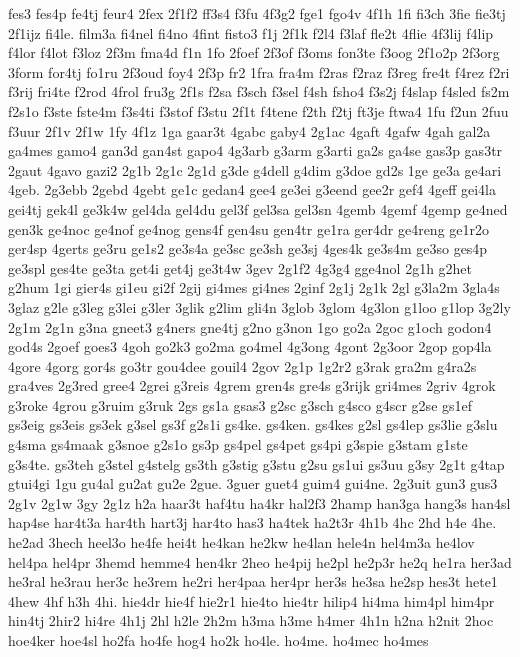 {fes3
fes4p
fe4tj
feur4
2fex
2f1f2
ff3s4
f3fu
4f3g2
fge1
fgo4v
4f1h
1fi
fi3ch
3fie
fie3tj
2f1ijz
fi4le.
film3a
fi4nel
fi4no
4fint
fisto3
f1j
2f1k
f2l4
f3laf
fle2t
4flie
4f3lij
f4lip
f4lor
f4lot
f3loz
2f3m
fma4d
f1n
1fo
2foef
2f3of
f3oms
fon3te
f3oog
2f1o2p
2f3org
3form
for4tj
fo1ru
2f3oud
foy4
2f3p
fr2
1fra
fra4m
f2ras
f2raz
f3reg
fre4t
f4rez
f2ri
f3rij
fri4te
f2rod
4frol
fru3g
2f1s
f2sa
f3sch
f3sel
f4sh
fsho4
f3s2j
f4slap
f4sled
fs2m
f2s1o
f3ste
fste4m
f3s4ti
f3stof
f3stu
2f1t
f4tene
f2th
f2tj
ft3je
ftwa4
1fu
f2un
2fuu
f3uur
2f1v
2f1w
1fy
4f1z
1ga
gaar3t
4gabc
gaby4
2g1ac
4gaft
4gafw
4gah
gal2a
ga4mes
gamo4
gan3d
gan4st
gapo4
4g3arb
g3arm
g3arti
ga2s
ga4se
gas3p
gas3tr
2gaut
4gavo
gazi2
2g1b
2g1c
2g1d
g3de
g4dell
g4dim
g3doe
gd2s
1ge
ge3a
ge4ari
4geb.
2g3ebb
2gebd
4gebt
ge1c
gedan4
gee4
ge3ei
g3eend
gee2r
gef4
4geff
gei4la
gei4tj
gek4l
ge3k4w
gel4da
gel4du
gel3f
gel3sa
gel3sn
4gemb
4gemf
4gemp
ge4ned
gen3k
ge4noc
ge4nof
ge4nog
gens4f
gen4su
gen4tr
ge1ra
ger4dr
ge4reng
ge1r2o
ger4sp
4gerts
ge3ru
ge1s2
ge3s4a
ge3sc
ge3sh
ge3sj
4ges4k
ge3s4m
ge3so
ges4p
ge3spl
ges4te
ge3ta
get4i
get4j
ge3t4w
3gev
2g1f2
4g3g4
gge4nol
2g1h
g2het
g2hum
1gi
gier4s
gi1eu
gi2f
2gij
gi4mes
gi4nes
2ginf
2g1j
2g1k
2gl
g3la2m
3gla4s
3glaz
g2le
g3leg
g3lei
g3ler
3glik
g2lim
gli4n
3glob
3glom
4g3lon
g1loo
g1lop
3g2ly
2g1m
2g1n
g3na
gneet3
g4ners
gne4tj
g2no
g3non
1go
go2a
2goc
g1och
godon4
god4s
2goef
goes3
4goh
go2k3
go2ma
go4mel
4g3ong
4gont
2g3oor
2gop
gop4la
4gore
4gorg
gor4s
go3tr
gou4dee
gouil4
2gov
2g1p
1g2r2
g3rak
gra2m
g4ra2s
gra4ves
2g3red
gree4
2grei
g3reis
4grem
gren4s
gre4s
g3rijk
gri4mes
2griv
4grok
g3roke
4grou
g3ruim
g3ruk
2gs
gs1a
gsas3
g2sc
g3sch
g4sco
g4scr
g2se
gs1ef
gs3eig
gs3eis
gs3ek
g3sel
gs3f
g2s1i
gs4ke.
gs4ken.
gs4kes
g2sl
gs4lep
gs3lie
g3slu
g4sma
gs4maak
g3snoe
g2s1o
gs3p
gs4pel
gs4pet
gs4pi
g3spie
g3stam
g1ste
g3s4te.
gs3teh
g3stel
g4stelg
gs3th
g3stig
g3stu
g2su
gs1ui
gs3uu
g3sy
2g1t
g4tap
gtui4gi
1gu
gu4al
gu2at
gu2e
2gue.
3guer
guet4
guim4
gui4ne.
2g3uit
gun3
gus3
2g1v
2g1w
3gy
2g1z
h2a
haar3t
haf4tu
ha4kr
hal2f3
2hamp
han3ga
hang3s
han4sl
hap4se
har4t3a
har4th
hart3j
har4to
has3
ha4tek
ha2t3r
4h1b
4hc
2hd
h4e
4he.
he2ad
3hech
heel3o
he4fe
hei4t
he4kan
he2kw
he4lan
hele4n
hel4m3a
he4lov
hel4pa
hel4pr
3hemd
hemme4
hen4kr
2heo
he4pij
he2pl
he2p3r
he2q
he1ra
her3ad
he3ral
he3rau
her3c
he3rem
he2ri
her4paa
her4pr
her3s
he3sa
he2sp
hes3t
hete1
4hew
4hf
h3h
4hi.
hie4dr
hie4f
hie2r1
hie4to
hie4tr
hilip4
hi4ma
him4pl
him4pr
hin4tj
2hir2
hi4re
4h1j
2hl
h2le
2h2m
h3ma
h3me
h4mer
4h1n
h2na
h2nit
2hoc
hoe4ker
hoe4sl
ho2fa
ho4fe
hog4
ho2k
ho4le.
ho4me.
ho4mec
ho4mes
}
